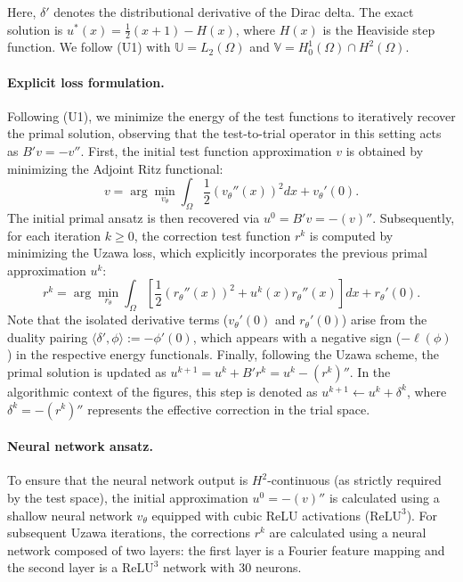 \documentclass{article}
\theoremstyle{definition}
\begin{document}
Here, $\delta'$ denotes the distributional derivative of the Dirac delta. The exact solution is $u^{*}(x)=\tfrac12 (x+1)-H(x)$, where $H(x)$ is the Heaviside step function. We follow (U1) with $\mathbb{U}=L_2(\Omega)$ and $\mathbb{V}=H^1_{0}(\Omega) \cap H^2(\Omega)$.
\paragraph{Explicit loss formulation.}
Following (U1), we minimize the energy of the test functions to iteratively recover the primal solution, observing that the test-to-trial operator in this setting acts as $B'v = -v''$. First, the initial test function approximation $v$ is obtained by minimizing the Adjoint Ritz functional:
\begin{equation}
    v = \arg \min_{v_\theta} \int_\Omega \frac{1}{2} (v_\theta''(x))^2 dx + v_\theta'(0).
\end{equation}
The initial primal ansatz is then recovered via $u^0 = B'v = -(v)''$. Subsequently, for each iteration $k \ge 0$, the correction test function $r^k$ is computed by minimizing the Uzawa loss, which explicitly incorporates the previous primal approximation $u^k$:
\begin{equation}
    r^{k} = \arg \min_{r_\theta} \int_\Omega \left[ \frac{1}{2} (r_\theta''(x))^2 + u^k(x) r_\theta''(x) \right] dx + r_\theta'(0).
\end{equation}
Note that the isolated derivative terms ($v_\theta'(0)$ and $r_\theta'(0)$) arise from the duality pairing $\langle \delta', \phi \rangle := -\phi'(0)$, which appears with a negative sign ($-\ell(\phi)$) in the respective energy functionals. Finally, following the Uzawa scheme, the primal solution is updated as $u^{k+1} = u^k + B'r^k = u^k - (r^k)''$. In the algorithmic context of the figures, this step is denoted as $u^{k+1} \leftarrow u^k + \delta^k$, where $\delta^k = -(r^k)''$ represents the effective correction in the trial space.

\paragraph{Neural network ansatz.}
To ensure that the neural network output is $H^2$-continuous (as strictly required by the test space), the initial approximation $u^0 = -(v)''$ is calculated using a shallow neural network $v_\theta$ equipped with cubic ReLU activations ($\text{ReLU}^3$). For subsequent Uzawa iterations, the corrections $r^k$ are calculated using a neural network composed of two layers: the first layer is a Fourier feature mapping and the second layer is a $\text{ReLU}^3$ network with 30 neurons.
\end{document}
